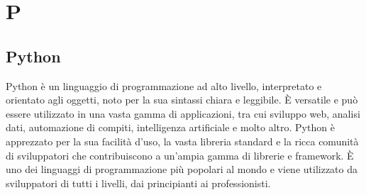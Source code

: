 \section{P}

\vspace{2em}
\subsection*{Python}
Python è un linguaggio di programmazione ad alto livello, interpretato e orientato agli oggetti, noto per la sua sintassi chiara e leggibile. È versatile e può essere utilizzato in una vasta gamma di applicazioni, tra cui sviluppo web, analisi dati, automazione di compiti, intelligenza artificiale e molto altro. Python è apprezzato per la sua facilità d'uso, la vasta libreria standard e la ricca comunità di sviluppatori che contribuiscono a un'ampia gamma di librerie e framework. È uno dei linguaggi di programmazione più popolari al mondo e viene utilizzato da sviluppatori di tutti i livelli, dai principianti ai professionisti.
